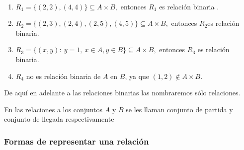 \solucion\
\begin{enumerate}
\item $R_{1}=\{\left(2,2\right),\left(4,4\right)\}\subseteq A\times B,$
entonces $R_{1}$ es relación binaria .
\item $R_{2}=\{\left(2,3\right),\left(2,4\right),\left(2,5\right),\left(4,5\right)\}\subseteq A\times B,$
entonces $R_{2}$es relación binaria.
\item $R_{3}=\{\left(x,y\right):\: y=1,\: x\in A,y\in B\}\subseteq A\times B,$
entonces $R_{3}$ es relación binaria.
\item $R_{4}$ no es relación binaria de $A$ en $B$, ya que $\left(1,2\right)\notin A\times B.$
\end{enumerate}
\nota  De aquí en adelante a las relaciones binarias las nombraremos
sólo relaciones.

\noindent\nota  En las relaciones a los conjuntos $A$ y $B$ se
les llaman conjunto de partida y conjunto de llegada respectivamente


\subsubsection{Formas de representar una relación}

